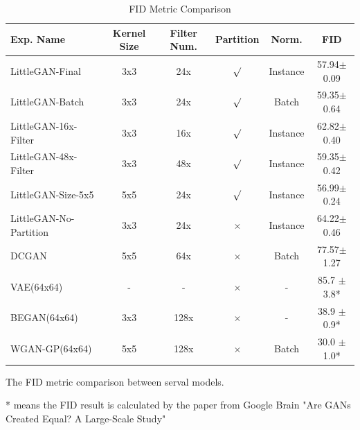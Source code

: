 \begin{table}
    \centering
    \caption{FID Metric Comparison}
    \label{result_fid}
    \begin{threeparttable}
    \begin{tabular}{l|ccccc}
        \hline
        Exp. Name               & Kernel Size   & Filter Num.   & Partition          & Norm.         & FID              \\ \hline
        LittleGAN-Final         & 3x3           & 24x           & $\surd$            & Instance      & 57.94$\pm$0.09   \\
        LittleGAN-Batch         & 3x3           & 24x           & $\surd$            & Batch         & 59.35$\pm$0.64   \\
        LittleGAN-16x-Filter    & 3x3           & 16x           & $\surd$            & Instance      & 62.82$\pm$0.40   \\
        LittleGAN-48x-Filter    & 3x3           & 48x           & $\surd$            & Instance      & 59.35$\pm$0.42   \\
        LittleGAN-Size-5x5      & 5x5           & 24x           & $\surd$            & Instance      & 56.99$\pm$0.24   \\
        LittleGAN-No-Partition  & 3x3           & 24x           & $\times$           & Instance      & 64.22$\pm$0.46   \\ \hline
        DCGAN                   & 5x5           & 64x           & $\times$           & Batch         & 77.57$\pm$1.27   \\ \hline
        VAE(64x64)              & -             & -             & $\times$           & -             & 85.7 $\pm$3.8*   \\
        BEGAN(64x64)            & 3x3           & 128x          & $\times$           & -             & 38.9 $\pm$0.9*   \\
        WGAN-GP(64x64)          & 5x5           & 128x          & $\times$           & Batch         & 30.0 $\pm$1.0*   \\ \hline
    \end{tabular}
    \begin{tablenotes}
        \item The FID metric comparison between serval models.
        \item[*] means the FID result is calculated by the paper from Google Brain "Are GANs Created Equal? A Large-Scale Study"
    \end{tablenotes}
\end{threeparttable}
\end{table}

